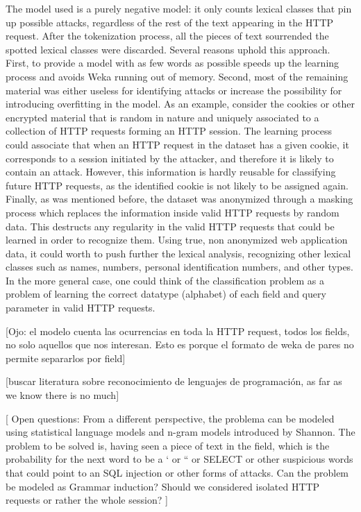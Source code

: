 \documentclass[runningheads,a4paper]{llncs}
\begin{document}
The model used is a purely negative model: it only counts lexical classes that pin up possible attacks, regardless of the rest of the text appearing in the HTTP request. After the tokenization process, all the pieces of text sourrended the spotted lexical classes were discarded. Several reasons uphold this approach. First, to provide a model with as few words as possible speeds up the learning process and avoids Weka running out of memory. Second, most of the remaining material was either useless for identifying attacks or increase the possibility for introducing overfitting in the model. As an example, consider the cookies or other encrypted material that is random in nature and uniquely associated to a collection of HTTP requests forming an HTTP session. The learning process could associate that when an HTTP request in the dataset has a given cookie, it corresponds to a session initiated by the attacker, and therefore it is likely to contain an attack. However, this information is hardly reusable for classifying future HTTP requests, as the identified cookie is not likely to be assigned again. Finally, as was mentioned before, the dataset was anonymized through a masking process which replaces the information inside valid HTTP requests by random data. This destructs any regularity in the valid HTTP requests that could be learned in order to recognize them. Using true, non anonymized web application data, it could worth to push further the lexical analysis, recognizing  other lexical classes such as names, numbers, personal identification numbers, and other types. In the more general case, one could think of the classification problem as a problem of learning the correct datatype (alphabet) of each field and query parameter in valid HTTP requests.

[Ojo: el modelo cuenta las ocurrencias en toda la HTTP request, todos los fields, no solo aquellos que nos interesan. Esto es porque el formato de weka de pares no permite separarlos por field]

[buscar literatura sobre reconocimiento de lenguajes de programación, as far as we know there is no much]

[
Open questions:
	From a different perspective, the problema can be modeled using statistical language models and n-gram models introduced by Shannon. The problem to be solved is, having seen a piece of text in the field, which is the probability for the next word to be a ‘ or “ or SELECT or other suspicious words that could point to an SQL injection or other forms of attacks.
	Can the problem be modeled as Grammar induction?
	Should we considered isolated HTTP requests or rather the whole session?
	]
\end{document}
